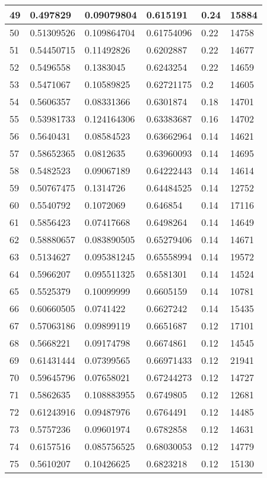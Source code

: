 \begin{longtable}{|l|l|l|l|l|l|}
49 & 0.497829 & 0.09079804 & 0.615191 & 0.24 & 15884 \\ \hline 
50 & 0.51309526 & 0.109864704 & 0.61754096 & 0.22 & 14758 \\ \hline 
51 & 0.54450715 & 0.11492826 & 0.6202887 & 0.22 & 14677 \\ \hline 
52 & 0.5496558 & 0.1383045 & 0.6243254 & 0.22 & 14659 \\ \hline 
53 & 0.5471067 & 0.10589825 & 0.62721175 & 0.2 & 14605 \\ \hline 
54 & 0.5606357 & 0.08331366 & 0.6301874 & 0.18 & 14701 \\ \hline 
55 & 0.53981733 & 0.124164306 & 0.63383687 & 0.16 & 14702 \\ \hline 
56 & 0.5640431 & 0.08584523 & 0.63662964 & 0.14 & 14621 \\ \hline 
57 & 0.58652365 & 0.0812635 & 0.63960093 & 0.14 & 14695 \\ \hline 
58 & 0.5482523 & 0.09067189 & 0.64222443 & 0.14 & 14614 \\ \hline 
59 & 0.50767475 & 0.1314726 & 0.64484525 & 0.14 & 12752 \\ \hline 
60 & 0.5540792 & 0.1072069 & 0.646854 & 0.14 & 17116 \\ \hline 
61 & 0.5856423 & 0.07417668 & 0.6498264 & 0.14 & 14649 \\ \hline 
62 & 0.58880657 & 0.083890505 & 0.65279406 & 0.14 & 14671 \\ \hline 
63 & 0.5134627 & 0.095381245 & 0.65558994 & 0.14 & 19572 \\ \hline 
64 & 0.5966207 & 0.095511325 & 0.6581301 & 0.14 & 14524 \\ \hline 
65 & 0.5525379 & 0.10099999 & 0.6605159 & 0.14 & 10781 \\ \hline 
66 & 0.60660505 & 0.0741422 & 0.6627242 & 0.14 & 15435 \\ \hline 
67 & 0.57063186 & 0.09899119 & 0.6651687 & 0.12 & 17101 \\ \hline 
68 & 0.5668221 & 0.09174798 & 0.6674861 & 0.12 & 14545 \\ \hline 
69 & 0.61431444 & 0.07399565 & 0.66971433 & 0.12 & 21941 \\ \hline 
70 & 0.59645796 & 0.07658021 & 0.67244273 & 0.12 & 14727 \\ \hline 
71 & 0.5862635 & 0.108883955 & 0.6749805 & 0.12 & 12681 \\ \hline 
72 & 0.61243916 & 0.09487976 & 0.6764491 & 0.12 & 14485 \\ \hline 
73 & 0.5757236 & 0.09601974 & 0.6782858 & 0.12 & 14631 \\ \hline 
74 & 0.6157516 & 0.085756525 & 0.68030053 & 0.12 & 14779 \\ \hline 
75 & 0.5610207 & 0.10426625 & 0.6823218 & 0.12 & 15130 \\ \hline 
\end{longtable}